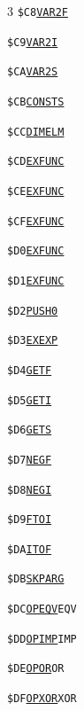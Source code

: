 \begin{multicols}{3}
\noindent\texttt{\$C8}\quad \hyperlink{l:VAR2F}{\texttt{VAR2F}}\par
\noindent\texttt{\$C9}\quad \hyperlink{l:VAR2I}{\texttt{VAR2I}}\par
\noindent\texttt{\$CA}\quad \hyperlink{l:VAR2S}{\texttt{VAR2S}}\par
\noindent\texttt{\$CB}\quad \hyperlink{l:CONSTS}{\texttt{CONSTS}}\par
\noindent\texttt{\$CC}\quad \hyperlink{l:DIMELM}{\texttt{DIMELM}}\par
\noindent\texttt{\$CD}\quad \hyperlink{l:EXFUNC}{\texttt{EXFUNC}}\par
\noindent\texttt{\$CE}\quad \hyperlink{l:EXFUNC}{\texttt{EXFUNC}}\par
\noindent\texttt{\$CF}\quad \hyperlink{l:EXFUNC}{\texttt{EXFUNC}}\par
\noindent\texttt{\$D0}\quad \hyperlink{l:EXFUNC}{\texttt{EXFUNC}}\par
\noindent\texttt{\$D1}\quad \hyperlink{l:EXFUNC}{\texttt{EXFUNC}}\par
\noindent\texttt{\$D2}\quad \hyperlink{l:PUSH0}{\texttt{PUSH0}}\par
\noindent\texttt{\$D3}\quad \hyperlink{l:EXEXP}{\texttt{EXEXP}}\par
\noindent\texttt{\$D4}\quad \hyperlink{l:GETF}{\texttt{GETF}}\par
\noindent\texttt{\$D5}\quad \hyperlink{l:GETI}{\texttt{GETI}}\par
\noindent\texttt{\$D6}\quad \hyperlink{l:GETS}{\texttt{GETS}}\par
\noindent\texttt{\$D7}\quad \hyperlink{l:NEGF}{\texttt{NEGF}}\par
\noindent\texttt{\$D8}\quad \hyperlink{l:NEGI}{\texttt{NEGI}}\par
\noindent\texttt{\$D9}\quad \hyperlink{l:FTOI}{\texttt{FTOI}}\par
\noindent\texttt{\$DA}\quad \hyperlink{l:ITOF}{\texttt{ITOF}}\par
\noindent\texttt{\$DB}\quad \hyperlink{l:SKPARG}{\texttt{SKPARG}}\par
\noindent\texttt{\$DC}\quad \hyperlink{l:OPEQV}{\texttt{OPEQV}}\hfill\texttt{EQV}\par
\noindent\texttt{\$DD}\quad \hyperlink{l:OPIMP}{\texttt{OPIMP}}\hfill\texttt{IMP}\par
\noindent\texttt{\$DE}\quad \hyperlink{l:OPOR}{\texttt{OPOR}}\hfill\texttt{OR}\par
\noindent\texttt{\$DF}\quad \hyperlink{l:OPXOR}{\texttt{OPXOR}}\hfill\texttt{XOR}\par

\end{multicols}
